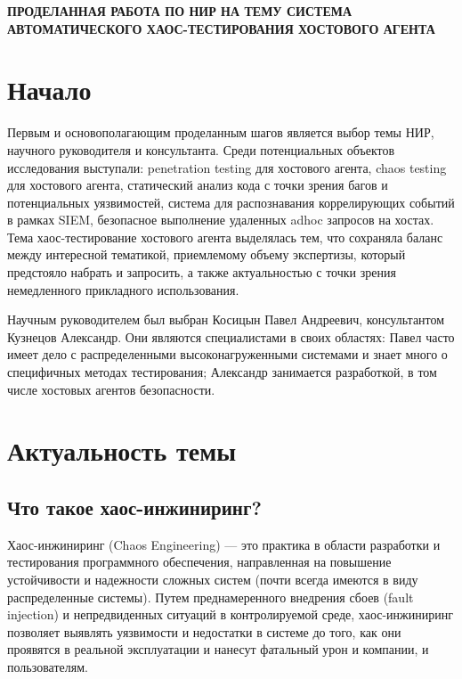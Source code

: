 \newpage
\begin{center}
  \textbf{\large ПРОДЕЛАННАЯ РАБОТА ПО НИР НА ТЕМУ СИСТЕМА АВТОМАТИЧЕСКОГО ХАОС-ТЕСТИРОВАНИЯ ХОСТОВОГО АГЕНТА}
\end{center}

\section{Начало}

Первым и основополагающим проделанным шагов является выбор темы НИР, научного руководителя и консультанта.
Среди потенциальных объектов исследования выступали: penetration testing для хостового агента, chaos testing для хостового агента,
статический анализ кода с точки зрения багов и потенциальных уязвимостей, система для распознавания коррелирующих событий в рамках SIEM,
безопасное выполнение удаленных adhoc запросов на хостах.
Тема хаос-тестирование хостового агента выделялась тем, что сохраняла баланс между интересной тематикой,
приемлемому объему экспертизы, который предстояло набрать и запросить, а также актуальностью с точки зрения
немедленного прикладного использования.

Научным руководителем был выбран Косицын Павел Андреевич, консультантом Кузнецов Александр.
Они являются специалистами в своих областях: Павел часто имеет дело с распределенными высоконагруженными системами
и знает много о специфичных методах тестирования; Александр занимается разработкой, в том числе хостовых агентов безопасности.

\section{Актуальность темы}

\subsection{Что такое хаос-инжиниринг?}
Хаос-инжиниринг (Chaos Engineering) — это практика в области разработки и тестирования программного обеспечения,
направленная на повышение устойчивости и надежности сложных систем (почти всегда имеются в виду распределенные системы).
Путем преднамеренного внедрения сбоев (fault injection) и непредвиденных ситуаций в контролируемой среде,
хаос-инжиниринг позволяет выявлять уязвимости и недостатки в системе до того, как они проявятся в реальной эксплуатации
и нанесут фатальный урон и компании, и пользователям.

